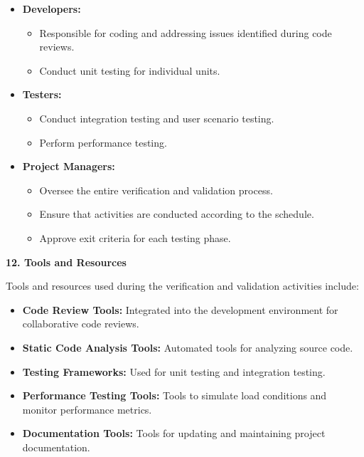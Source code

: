 \documentclass[
]{article}
\begin{document}
\begin{itemize}
\item
  \textbf{Developers:}

  \begin{itemize}
  \item
    Responsible for coding and addressing issues identified during code
    reviews.
  \item
    Conduct unit testing for individual units.
  \end{itemize}
\item
  \textbf{Testers:}

  \begin{itemize}
  \item
    Conduct integration testing and user scenario testing.
  \item
    Perform performance testing.
  \end{itemize}
\item
  \textbf{Project Managers:}

  \begin{itemize}
  \item
    Oversee the entire verification and validation process.
  \item
    Ensure that activities are conducted according to the schedule.
  \item
    Approve exit criteria for each testing phase.
  \end{itemize}
\end{itemize}

\textbf{12. Tools and Resources}

Tools and resources used during the verification and validation
activities include:

\begin{itemize}
\item
  \textbf{Code Review Tools:} Integrated into the development
  environment for collaborative code reviews.
\item
  \textbf{Static Code Analysis Tools:} Automated tools for analyzing
  source code.
\item
  \textbf{Testing Frameworks:} Used for unit testing and integration
  testing.
\item
  \textbf{Performance Testing Tools:} Tools to simulate load conditions
  and monitor performance metrics.
\item
  \textbf{Documentation Tools:} Tools for updating and maintaining
  project documentation.
\end{itemize}
\end{document}
